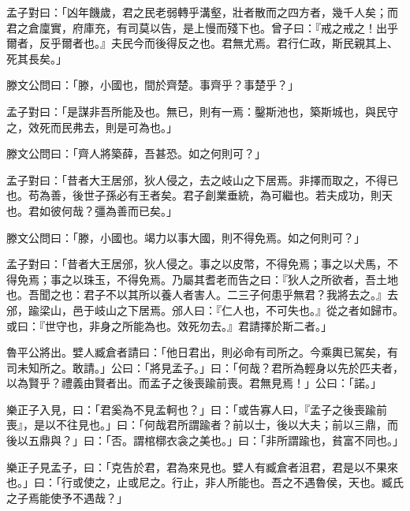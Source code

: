 \documentclass[12pt,a4paper]{ctexbook}
\begin{document}
孟子對曰：「凶年饑歲，君之民老弱轉乎溝壑，壯者散而之四方者，幾千人矣；而君之倉廩實，府庫充，有司莫以告，是上慢而殘下也。曾子曰：『戒之戒之！出乎爾者，反乎爾者也。』夫民今而後得反之也。君無尤焉。君行仁政，斯民親其上、死其長矣。」\par
滕文公問曰：「滕，小國也，間於齊楚。事齊乎？事楚乎？」\par
孟子對曰：「是謀非吾所能及也。無已，則有一焉：鑿斯池也，築斯城也，與民守之，效死而民弗去，則是可為也。」\par
滕文公問曰：「齊人將築薛，吾甚恐。如之何則可？」\par
孟子對曰：「昔者大王居邠，狄人侵之，去之岐山之下居焉。非擇而取之，不得已也。苟為善，後世子孫必有王者矣。君子創業垂統，為可繼也。若夫成功，則天也。君如彼何哉？彊為善而已矣。」\par
滕文公問曰：「滕，小國也。竭力以事大國，則不得免焉。如之何則可？」\par
孟子對曰：「昔者大王居邠，狄人侵之。事之以皮幣，不得免焉；事之以犬馬，不得免焉；事之以珠玉，不得免焉。乃屬其耆老而告之曰：『狄人之所欲者，吾土地也。吾聞之也：君子不以其所以養人者害人。二三子何患乎無君？我將去之。』去邠，踰梁山，邑于岐山之下居焉。邠人曰：『仁人也，不可失也。』從之者如歸市。或曰：『世守也，非身之所能為也。效死勿去。』君請擇於斯二者。」\par
魯平公將出。嬖人臧倉者請曰：「他日君出，則必命有司所之。今乘輿已駕矣，有司未知所之。敢請。」公曰：「將見孟子。」曰：「何哉？君所為輕身以先於匹夫者，以為賢乎？禮義由賢者出。而孟子之後喪踰前喪。君無見焉！」公曰：「諾。」\par
樂正子入見，曰：「君奚為不見孟軻也？」曰：「或告寡人曰，『孟子之後喪踰前喪』，是以不往見也。」曰：「何哉君所謂踰者？前以士，後以大夫；前以三鼎，而後以五鼎與？」曰：「否。謂棺槨衣衾之美也。」曰：「非所謂踰也，貧富不同也。」\par
樂正子見孟子，曰：「克告於君，君為來見也。嬖人有臧倉者沮君，君是以不果來也。」曰：「行或使之，止或尼之。行止，非人所能也。吾之不遇魯侯，天也。臧氏之子焉能使予不遇哉？」\par
\end{document}
